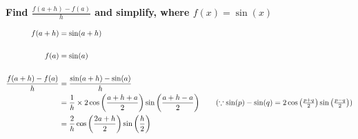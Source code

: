 \documentclass[crop=false,fleqn]{standalone}
\begin{document}
    \textbf{Find $\frac{f(a+h)-f(a)}{h}$ and simplify, where $f(x)=\sin(x)$}


    \begin{align*}
        f(a+h) &= \sin(a+h) \\
        \\
        f(a) &= \sin(a) \\
        \\
        \frac{f(a+h)-f(a)}{h} &= \frac{\sin(a+h)-\sin(a)}{h} \\
            &= \frac{1}{h} \times 2
                \cos\left(\frac{a + h + a}{2}\right)
                \sin\left(\frac{a + h - a}{2}\right)
                \tag{$ \because \sin(p)-\sin(q) =
                    2 \cos\left(\frac{p+q}{2}\right)
                    \sin\left(\frac{p-q}{2}\right)
                $} \\
            &= \frac{2}{h}
                \cos\left(\frac{2a+h}{2}\right)
                \sin\left(\frac{h}{2}\right)
    \end{align*}
\end{document}
